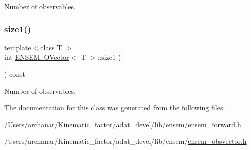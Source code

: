 Number of observables. 

\mbox{\label{classENSEM_1_1OVector_af2035852c6cefe80834b8e2a17648113}} 
\subsubsection{\texorpdfstring{size1()}{size1()}\hspace{0.1cm}{\footnotesize\ttfamily [2/2]}}
{\footnotesize\ttfamily template$<$class T $>$ \\
int \mbox{\hyperlink{classENSEM_1_1OVector}{E\+N\+S\+E\+M\+::\+O\+Vector}}$<$ T $>$\+::size1 (\begin{DoxyParamCaption}{ }\end{DoxyParamCaption}) const\hspace{0.3cm}{\ttfamily [inline]}}



Number of observables. 



The documentation for this class was generated from the following files\+:\begin{DoxyCompactItemize}
\item 
/\+Users/archanar/\+Kinematic\+\_\+factor/adat\+\_\+devel/lib/ensem/\mbox{\hyperlink{lib_2ensem_2ensem__forward_8h}{ensem\+\_\+forward.\+h}}\item 
/\+Users/archanar/\+Kinematic\+\_\+factor/adat\+\_\+devel/lib/ensem/\mbox{\hyperlink{lib_2ensem_2ensem__obsvector_8h}{ensem\+\_\+obsvector.\+h}}\end{DoxyCompactItemize}
